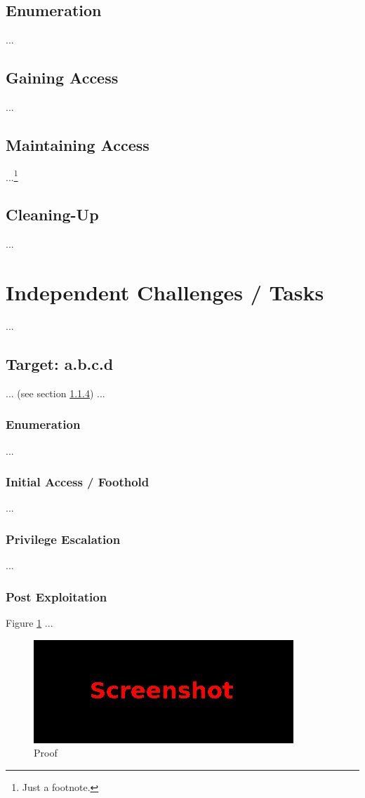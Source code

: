 \subsection{Enumeration}\label{sec:sec3-enum}
%
...
%
%
%
\subsection{Gaining Access}\label{sec:sec3-gain}
%
...
%
%
%
\subsection{Maintaining Access}\label{sec:sec3-main}
%
...\footnote{Just a footnote.}
%
%
%
\subsection{Cleaning-Up}\label{sec:sec3-clean}
%
...
%
%
%
\section{Independent Challenges / Tasks}\label{sec:sec4}
%
...
%
%
%
\subsection{Target: a.b.c.d}\label{sec:sec4-target1}
%
... (see section \ref{sec:sec4-target1-post}) ...
%
%
%
\subsubsection{Enumeration}\label{sec:sec4-target1-enum}
%
...
%
%
%
\subsubsection{Initial Access / Foothold}\label{sec:sec4-target1-init}
%
...
%
%
%
\subsubsection{Privilege Escalation}\label{sec:sec4-target1-priv}
%
...
%
%
%
\subsubsection{Post Exploitation}\label{sec:sec4-target1-post}
%
Figure \ref{fig:sec4-target1-proof} ...

\begin{figure}[H]
    \centering
    \includegraphics[width=\textwidth]{img/assignment1/screen1.png}
    \caption{Proof}\label{fig:sec4-target1-proof}
\end{figure}
%
%
%
